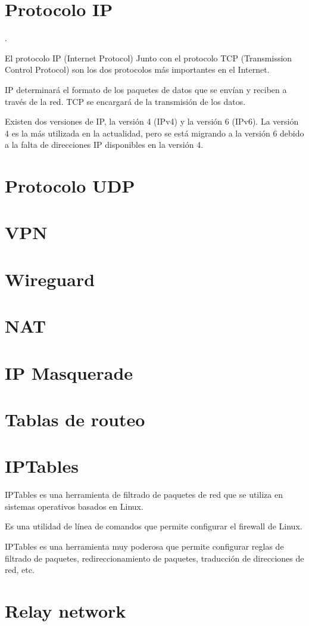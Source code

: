 \section{Protocolo IP} %

\lipsum[3-9][4-8].

El protocolo IP (Internet Protocol) Junto con el protocolo TCP (Transmission Control Protocol) son los dos protocolos más importantes en el Internet.

IP determinará el formato de los paquetes de datos que se envían y reciben a través de la red. TCP se encargará de la transmisión de los datos.

Existen dos versiones de IP, la versión 4 (IPv4) y la versión 6 (IPv6). La versión 4 es la más utilizada en la actualidad, pero se está migrando a la versión 6 debido a la falta de direcciones IP disponibles en la versión 4.

\section{Protocolo UDP} %



\section{VPN} %
\section{Wireguard} %

\section{NAT} %
\section{IP Masquerade} %

\section{Tablas de routeo}  %


\section{IPTables} %
IPTables es una herramienta de filtrado de paquetes de red que se utiliza en sistemas operativos basados en Linux.

Es una utilidad de línea de comandos que permite configurar el firewall de Linux. 

IPTables es una herramienta muy poderosa que permite configurar reglas de filtrado de paquetes, redireccionamiento de paquetes, traducción de direcciones de red, etc.


\section{Relay network}%

